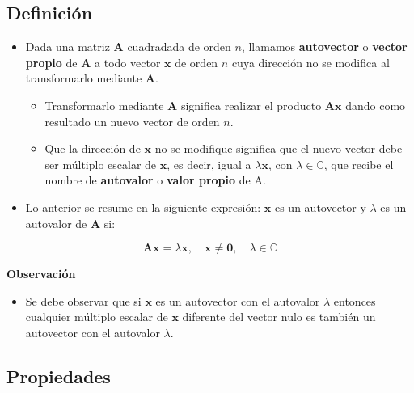 \documentclass[openany]{book}
\providecommand{\tightlist}{%
  \setlength{\itemsep}{0pt}\setlength{\parskip}{0pt}}
\begin{document}
\hypertarget{definiciuxf3n}{%
\subsection{Definición}\label{definiciuxf3n}}

\begin{itemize}
\item
  Dada una matriz \(\textbf{A}\) cuadradada de orden \(n\), llamamos \textbf{autovector} o \textbf{vector propio} de \(\textbf{A}\) a todo vector \(\textbf{x}\) de orden \(n\) cuya dirección no se modifica al transformarlo mediante \(\textbf{A}\).

  \begin{itemize}
  \tightlist
  \item
    Transformarlo mediante \(\textbf{A}\) significa realizar el producto \(\textbf{Ax}\) dando como resultado un nuevo vector de orden \(n\).
  \item
    Que la dirección de \(\textbf{x}\) no se modifique significa que el nuevo vector debe ser múltiplo escalar de \(\textbf{x}\), es decir, igual a \(\lambda \textbf{x}\), con \(\lambda \in \mathbb{C}\), que recibe el nombre de \textbf{autovalor} o \textbf{valor propio} de A.
  \end{itemize}
\item
  Lo anterior se resume en la siguiente expresión: \(\textbf{x}\) es un autovector y \(\lambda\) es un autovalor de \(\textbf{A}\) si:
\end{itemize}

\[\textbf{Ax} = \lambda \textbf{x}, \quad \textbf{x} \neq \textbf{0}, \quad \lambda \in \mathbb{C}\]

\textbf{Observación}

\begin{itemize}
\tightlist
\item
  Se debe observar que si \(\textbf{x}\) es un autovector con el autovalor \(\lambda\) entonces cualquier múltiplo escalar de \(\textbf{x}\) diferente del vector nulo es también un autovector con el autovalor \(\lambda\).
\end{itemize}

\hypertarget{propiedades}{%
\subsection{Propiedades}\label{propiedades}}
\end{document}
